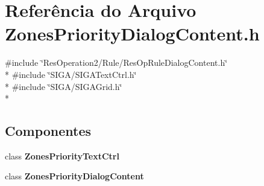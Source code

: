 \section{Referência do Arquivo Zones\+Priority\+Dialog\+Content.\+h}
\label{_zones_priority_dialog_content_8h}
{\ttfamily \#include \char`\"{}Res\+Operation2/\+Rule/\+Res\+Op\+Rule\+Dialog\+Content.\+h\char`\"{}}\\*
{\ttfamily \#include \char`\"{}S\+I\+G\+A/\+S\+I\+G\+A\+Text\+Ctrl.\+h\char`\"{}}\\*
{\ttfamily \#include \char`\"{}S\+I\+G\+A/\+S\+I\+G\+A\+Grid.\+h\char`\"{}}\\*
\subsection*{Componentes}
\begin{DoxyCompactItemize}
\item 
class {\bf Zones\+Priority\+Text\+Ctrl}
\item 
class {\bf Zones\+Priority\+Dialog\+Content}
\end{DoxyCompactItemize}
